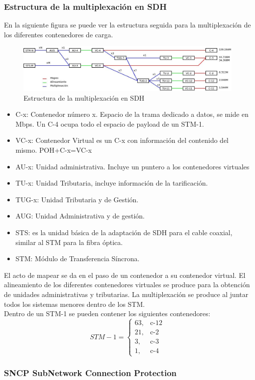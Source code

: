 \subsubsection{Estructura de la multiplexación en SDH}
En la siguiente figura se puede ver la estructura seguida para la multiplexación de los diferentes contenedores de carga.
\begin{figure}[H]
\centering
\includegraphics[width=\textwidth]{Imagen/diamuxSDH.jpg}
\caption{Estructura de la multiplexación en SDH}
\label{}
\end{figure}
\begin{itemize}
	\item C-x: Contenedor número x. Espacio de la trama dedicado a datos, se mide en Mbps. Un C-4 ocupa todo el espacio de payload de un STM-1.
	\item VC-x: Contenedor Virtual es un C-x con información del contenido del mismo. POH+C-x=VC-x
	\item AU-x: Unidad administrativa. Incluye un puntero a los contenedores virtuales
	\item TU-x: Unidad Tributaria, incluye información de la tarificación.
	\item TUG-x: Unidad Tributaria y de Gestión.
	\item AUG: Unidad Administrativa y de gestión.
	\item STS: es la unidad básica de la adaptación de SDH para el cable coaxial, similar al STM para la fibra óptica.
	\item STM: Módulo de Transferencia Síncrona.
\end{itemize}
El acto de mapear se da en el paso de un contenedor a su contenedor virtual. El alineamiento de los diferentes contenedores virtuales se produce para la obtención de unidades administrativas y tributarias. La multiplexación se produce al juntar todos los sistemas menores dentro de los STM.\\
Dentro de un STM-1 se pueden contener los siguientes contenedores:
\[STM-1=
\begin{cases}
63, & \text{c-12}\\
21, & \text{c-2}\\
3, & \text{c-3}\\
1, & \text{c-4}
\end{cases}
\]
\subsubsection{SNCP SubNetwork Connection Protection}